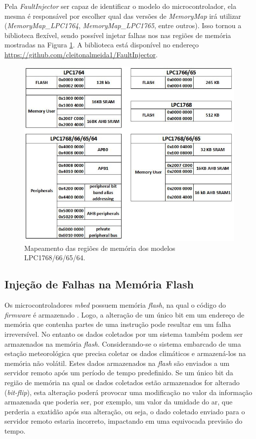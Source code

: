 Pela \textit{FaultInjector} ser capaz de identificar o modelo do microcontrolador, ela mesma é responsável por escolher qual das versões de \textit{MemoryMap} irá utilizar (\textit{MemoryMap\_LPC1764}, \textit{MemoryMap\_LPC1765}, entre outros). Isso tornou a biblioteca flexível, sendo possível injetar falhas nos nas regiões de memória mostradas na Figura \ref{Img:memoryMap}. A biblioteca está disponível no endereço \url{https://github.com/cleitonalmeida1/FaultInjector}.

\begin{figure}[H]
	\centering
	\includegraphics[width=1.0\textwidth]{figuras/memoryMap.jpg}
	\caption[Mapas das Regiões de Memória dos Modelos LPC1768/66/65/64]{Mapeamento das regiões de memória dos modelos LPC1768/66/65/64.}
	\label{Img:memoryMap}	
\end{figure}


\subsection{Injeção de Falhas na Memória Flash} \label{subsec:InjecaoFalhasFlash}

Os microcontroladores \textit{mbed} possuem memória \textit{flash}, na qual o código do \textit{firmware} é armazenado \cite{manualLpc176x:2016}. Logo, a alteração de um único bit em um endereço de memória que contenha partes de uma instrução pode resultar em um falha irreversível. No entanto os dados coletados por um sistema também podem ser armazenados na memória \textit{flash}. Considerando-se o sistema embarcado de uma estação meteorológica que precisa coletar os dados climáticos e armazená-los na memória não volátil. Estes dados armazenados na \textit{flash} são enviados a um servidor remoto após um período de tempo predefinido. Se um único bit da região de memória na qual os dados coletados estão armazenados for alterado (\textit{bit-flip}), esta alteração poderá provocar uma modificação no valor da informação armazenada que poderia ser, por exemplo, um valor da umidade do ar, que perderia a exatidão após sua alteração, ou seja, o dado coletado enviado para o servidor remoto estaria incorreto, impactando em uma equivocada previsão do tempo. 

